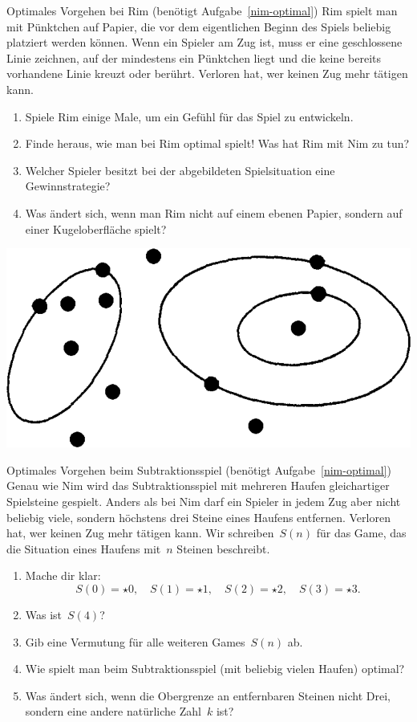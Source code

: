 \documentclass{zirkelblatt}
\begin{document}
\begin{aufgabe}{Optimales Vorgehen bei Rim
(benötigt Aufgabe~\ref{nim-optimal})}
Rim spielt man mit Pünktchen auf Papier, die vor dem eigentlichen Beginn des
Spiels beliebig platziert werden können. Wenn ein Spieler am Zug ist, muss er
eine geschlossene Linie zeichnen, auf der mindestens ein Pünktchen liegt und
die keine bereits vorhandene Linie kreuzt oder berührt. Verloren hat, wer
keinen Zug mehr tätigen kann.

\begin{enumerate}
\item Spiele Rim einige Male, um ein Gefühl für das Spiel zu entwickeln.
\item Finde heraus, wie man bei Rim optimal spielt! Was hat Rim mit Nim zu tun?
\item Welcher Spieler besitzt bei der abgebildeten Spielsituation eine
Gewinnstrategie?
\item Was ändert sich, wenn man Rim nicht auf einem ebenen Papier, sondern auf
einer Kugeloberfläche spielt?
\end{enumerate}

\begin{center}
\includegraphics[scale=0.3]{rim}
\end{center}
\end{aufgabe}

\begin{aufgabe}{Optimales Vorgehen beim Subtraktionsspiel
(benötigt Aufgabe~\ref{nim-optimal})}
\label{subtraktionsspiel-optimal}
Genau wie Nim wird das Subtraktionsspiel mit mehreren Haufen gleichartiger
Spielsteine gespielt. Anders als bei Nim darf ein Spieler in jedem Zug aber
nicht beliebig viele, sondern höchstens drei Steine eines Haufens
entfernen. Verloren hat, wer keinen Zug mehr tätigen kann.
Wir schreiben~$S(n)$ für das Game, das die Situation eines Haufens mit~$n$
Steinen beschreibt.
\begin{enumerate}
\item Mache dir klar:
\[ S(0) = \star0, \quad S(1) = \star1, \quad S(2) = \star2, \quad
  S(3) = \star3. \]
\item Was ist~$S(4)$?
\item Gib eine Vermutung für alle weiteren Games~$S(n)$ ab.
\item Wie spielt man beim Subtraktionsspiel (mit beliebig vielen Haufen)
optimal?
\item Was ändert sich, wenn die Obergrenze an entfernbaren Steinen nicht Drei,
sondern eine andere natürliche Zahl~$k$ ist?
\end{enumerate}
\end{aufgabe}
\end{document}
